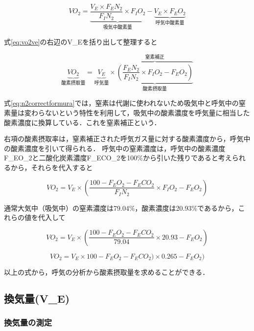 \begin{equation}
  \label{eq:vo2ve}
  VO_2 = \underbrace{\frac{V_E \times F_EN_2}{F_IN_2} \times F_IO_2}_{吸気中酸素量} - \underbrace{V_E \times F_EO_2}_{呼気中酸素量}
\end{equation}

式\ref{eq:vo2ve}の右辺のV_Eを括り出して整理すると

\begin{equation}
  \label{eq:n2correctformura}
  \underbrace{VO_2}_{酸素摂取量} = \underbrace{V_E}_{呼気量} \times \underbrace{\overbrace{( \frac{F_EN_2}{F_IN_2} \times F_IO_2 - F_EO_2 )}^{窒素補正}}_{酸素摂取量}
\end{equation}

式\ref{eq:n2correctformura}では，窒素は代謝に使われないため吸気中と呼気中の窒素量は変わらないという特性を利用して，吸気中の酸素濃度を呼気量に相当した酸素濃度に換算している．これを窒素補正という．

右項の酸素摂取率は，窒素補正された呼気ガス量に対する酸素濃度から，呼気中の酸素濃度を引いて得られる．
呼気中の窒素濃度は，呼気中の酸素濃度F_EO_2と二酸化炭素濃度F_ECO_2を100\%から引いた残りであると考えられるから，それらを代入すると

\begin{equation}
  VO_2 = V_E \times (\frac{100 - F_EO_2 - F_ECO_2}{F_IN_2} \times F_IO_2 - F_EO_2)
\end{equation}

通常大気中（吸気中）の窒素濃度は79.04\%，酸素濃度は20.93\%であるから，これらの値を代入して

\begin{equation}
  VO_2 = V_E \times (\frac{100 - F_EO_2 - F_ECO_2}{79.04} \times 20.93 - F_EO_2)
\end{equation}

\begin{equation}
  VO_2 = V_E \times { {100 - F_EO_2 - F_ECO_2)} \times 0.265 - F_EO_2) }
\end{equation}

以上の式から，呼気の分析から酸素摂取量を求めることができる．

\subsection{換気量(V_E)}

\subsubsection{換気量の測定}

